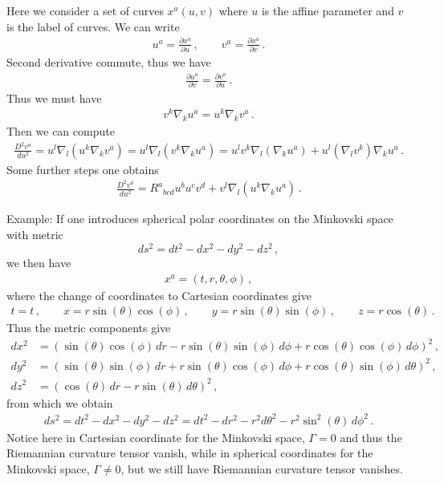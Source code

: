 \documentclass[11pt, onesided]{book}
\theoremstyle{break}
\theoremstyle{break}
\newcommand{\pd}{\partial}
\newcommand{\example}{\color{green}Example: \color{black}}
\begin{document}
Here we consider a set of curves $x^a(u,v)$ where $u$ is the affine parameter and $v$ is the label of curves. We can write
\begin{align*}
u^a = \frac{\pd x^a}{\pd u}\,, \qquad v^a =\frac{\pd x^a}{\pd v}\,.
\end{align*}
Second derivative commute, thus we have
\begin{align*}
\frac{\pd u^a}{\pd v} = \frac{\pd v^a}{\pd u}\,.
\end{align*}
Thus we must have
\begin{align*}
v^k \nabla_k u^a = u^k \nabla_k v^a\,.
\end{align*}
Then we can compute
\begin{align*}
\frac{D^2 v^a}{du^2} = u^l \nabla_l \left( u^k \nabla_k v^a\right) = u^l\nabla_l \left( v^k \nabla_k  u^a\right) = u^l v^k \nabla_l \left( \nabla_k u^a\right) + u^l\left( \nabla_l v^k\right) \nabla_k u^a\,.
\end{align*}
Some further steps one obtains
\begin{align*}
\frac{D^2 v^a}{du^2} = R^a{}_{bcd}u^bu^cv^d + v^l \nabla_l\left( u^k \nabla_k u^a\right)\,. 
\end{align*}

\example
If one introduces spherical polar coordinates on the Minkovski space with metric 
$$ds^2 =dt^2 - dx^2 - dy^2 - dz^2  \,,$$
we then have
\begin{align*}
x^a = (t,r,\theta, \phi)\,,
\end{align*}
where the change of coordinates to Cartesian coordinates give
\begin{align*}
t =t \,,\qquad x = r\sin(\theta) \cos(\phi)\,,\qquad 
y = r\sin(\theta) \sin(\phi)\,,\qquad z = r\cos(\theta)\,.
\end{align*}
Thus the metric components give
\begin{align*}
dx^2 &= (\sin(\theta) \cos(\phi) \, dr  - r\sin(\theta) \sin(\phi) \, d\phi + r\cos(\theta) \cos(\phi)\, d\phi)^2\,,\\
dy^2 &= (\sin(\theta) \sin(\phi)\, dr + r\sin(\theta) \cos(\phi) \, d\phi + r \cos(\theta) \sin(\phi) \, d\theta)^2\,,\\
dz^2 &= (\cos(\theta)\, dr - r\sin(\theta) \, d\theta)^2\,,
\end{align*}
from which we obtain
\begin{align*}
ds^2 = dt^2 - dx^2 - dy^2 - dz^2 = dt^2 - dr^2 - r^2 d\theta^2 - r^2 \sin^2(\theta) \, d\phi^2\,.
\end{align*}
Notice here in Cartesian coordinate for the Minkovski space, $\Gamma = 0$ and thus the Riemannian curvature tensor vanish, while in spherical coordinates for the Minkovski space, $\Gamma \neq 0$, but we still have Riemannian curvature tensor vanishes. \\
\end{document}
